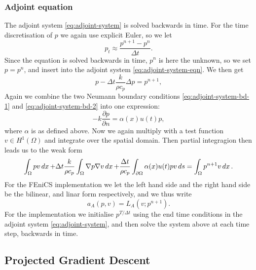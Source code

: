 \subsubsection{Adjoint equation}

The adjoint system \eqref{eq:adjoint-system} is solved backwards in time. For the time discretisation of $p$ we again use explicit Euler, so we let 
\begin{equation*}
 p_t \approx \frac{p^{n+1} - p^n}{\Delta t}.
\end{equation*}
Since the equation is solved backwards in time, $p^n$ is here the unknown, so we set $p=p^n$, and insert into the adjoint system \eqref{eq:adjoint-system-eqn}. We then get
\begin{equation*}
    p - \Delta t\frac{k}{\rho c_p}\Delta p =  p^{n+1}, 
\end{equation*}
Again we combine the two Neumann boundary conditions \eqref{eq:adjoint-system-bd-1} and \eqref{eq:adjoint-system-bd-2} into one expression:
\begin{equation*}
    -k\frac{\partial p}{\partial n} = \alpha(x)u(t)p,
\end{equation*}
where $\alpha$ is as defined above. Now we again multiply with a test function $v\in H^1(\Omega)$ and integrate over the spatial domain. Then partial integragion then leads us to the weak form
\begin{equation*}
    \int_\Omega pv\mathop{dx} + \Delta t\frac{k}{\rho c_p} \int_\Omega \nabla p \nabla v \mathop{dx} + \frac{\Delta t}{\rho c_p}\int_{\partial\Omega} \alpha(x)u(t)pv \mathop{ds}  = \int_\Omega p^{n+1}v\mathop{dx}.
\end{equation*}
For the FEniCS implementation we let the left hand side and the right hand side be the bilinear, and linar form respectively, and we thus write
\begin{equation*}
    a_A(p, v) = L_A(v; p^{n+1}).
\end{equation*}
For the implementation we initialise $p^{T/\Delta t}$ using the end time conditions in the adjoint system \eqref{eq:adjoint-system}, and then solve the system above at each time step, backwards in time.


\subsection{Projected Gradient Descent}

